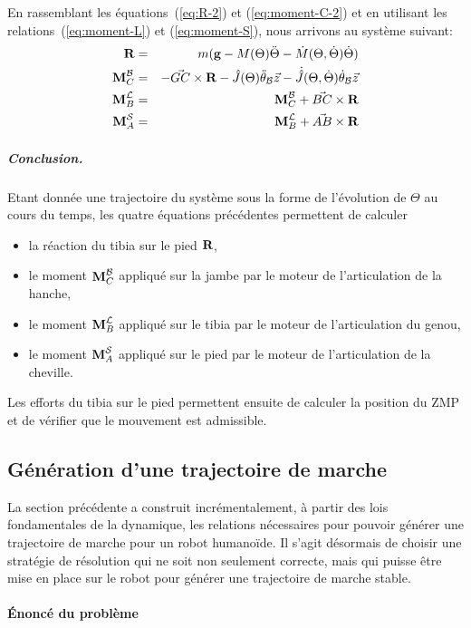 En rassemblant les équations~(\ref{eq:R-2}) et (\ref{eq:moment-C-2})
et en utilisant les relations~(\ref{eq:moment-L}) et
(\ref{eq:moment-S}), nous arrivons au système suivant:
\begin{eqnarray}
\textbf{R}&=& m(\textbf{g} - M(\Theta)\ddot{\Theta} - \dot{M}(\Theta,\dot{\Theta})\dot{\Theta})\\
\textbf{M}^{\cal B}_C&=& -\vec{GC}\times \textbf{R} -
\hat{J}(\Theta) \ddot{\theta}_{\cal B} \vec{z} -
\dot{\hat{J}}(\Theta,\dot{\Theta})\dot{\theta}_{\cal B} \vec{z}\\
\textbf{M}^{\cal L}_B &=& \textbf{M}^{\cal B}_C + \vec{BC}\times \textbf{R}  \\
\textbf{M}^{\cal S}_A &=&\textbf{M}^{\cal L}_B + \vec{AB}\times \textbf{R}
\end{eqnarray}

\subparagraph{Conclusion.} Etant donnée une trajectoire du système sous
la forme de l'évolution de $\Theta$ au cours du temps, les quatre
équations précédentes permettent de calculer
\begin{itemize}
  \item la réaction du tibia sur le pied $\textbf{R}$,
  \item le moment $\textbf{M}^{\cal B}_C$ appliqué sur la jambe par le moteur de
    l'articulation de la hanche,
  \item le moment $\textbf{M}^{\cal L}_B$ appliqué sur le tibia par le
    moteur de l'articulation du genou,
    \item le moment $\textbf{M}^{\cal S}_A$ appliqué sur le pied par le
      moteur de l'articulation de la cheville.
\end{itemize}
Les efforts du tibia sur le pied permettent ensuite de calculer la
position du ZMP et de vérifier que le mouvement est admissible.


\subsection{Génération d'une trajectoire de marche}

La section précédente a construit incrémentalement, à partir des lois
fondamentales de la dynamique, les relations nécessaires pour pouvoir
générer une trajectoire de marche pour un robot humanoïde. Il s'agit
désormais de choisir une stratégie de résolution qui ne soit non
seulement correcte, mais qui puisse être mise en place sur le robot
pour générer une trajectoire de marche stable.

\paragraph{Énoncé du problème}

